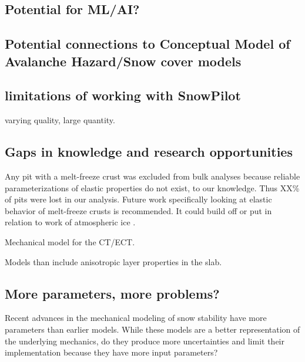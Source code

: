 \documentclass[journal abbreviation, manuscript]{copernicus}
\begin{document}
\subsection{Potential for ML/AI?}
\subsection{Potential connections to Conceptual Model of Avalanche Hazard/Snow cover models}
\subsection{limitations of working with SnowPilot}
varying quality, large quantity.
\subsection{Gaps in knowledge and research opportunities}
Any pit with a melt-freeze crust was excluded from bulk analyses because reliable parameterizations of elastic properties do not exist, to our knowledge. Thus \textcolor{YellowOrange}{XX\%} of pits were lost in our analysis. Future work specifically looking at elastic behavior of melt-freeze crusts is recommended. It could build off or put in relation to work of atmospheric ice \citep{kermani_bending_2008, palanque2023}.

Mechanical model for the CT/ECT.

Models than include anisotropic layer properties in the slab.

\subsection{More parameters, more problems?}
Recent advances in the mechanical modeling of snow stability have more parameters than earlier models. While these models are a better representation of the underlying mechanics, do they produce more uncertainties and limit their implementation because they have more input parameters?
\end{document}
